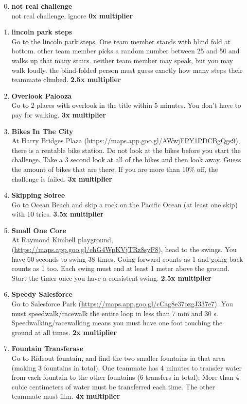 \documentclass{article}
\begin{document}
\begin{enumerate}
    \setcounter{enumi}{-1}
    \item \textbf{not real challenge} \\ not real challenge, ignore \textbf{0x multiplier}
    \item \textbf{lincoln park steps} \\ Go to the lincoln park steps. One team member stands with blind fold at bottom. other team member picks a random number between 25 and 50 and walks up that many stairs. neither team member may speak, but you may walk loudly. the blind-folded person must guess exactly how many steps their teammate climbed. \textbf{2.5x multiplier}
    \item \textbf{Overlook Palooza} \\ Go to 2 places with overlook in the title within 5 minutes. You don't have to pay for walking. \textbf{3x multiplier}
    \item \textbf{Bikes In The City} \\ At Harry Bridges Plaza (\url{https://maps.app.goo.gl/AWwjFPY1PDCBgQgs9}), there is a rentable bike station. Do not look at the bikes before you start the challenge. Take a 3 second look at all of the bikes and then look away. Guess the amount of bikes that are there. If you are more than 10\% off, the challenge is failed. \textbf{3x multiplier} 
    \item \textbf{Skipping Soiree} \\ Go to Ocean Beach and skip a rock on the Pacific Ocean (at least one skip) with 10 tries. \textbf{3.5x multiplier}
    \item \textbf{Small One Core} \\ At Raymond Kimbell playground,  (\url{https://maps.app.goo.gl/ehG4WpKVjTRz8syF8}), head to the swings. You have 60 seconds to swing 38 times. Going forward counts as 1 and going back counts as 1 too. Each swing must end at least 1 meter above the ground. Start the timer once you have a consistent swing. \textbf{2.5x multiplier}
    \item \textbf{Speedy Salesforce} \\ Go to Salesforce Park (\url{https://maps.app.goo.gl/cCag8e37ozgJ337e7}). You must speedwalk/racewalk the entire loop in less than 7 min and 30 s. Speedwalking/racewalking means you must have one foot touching the ground at all times. \textbf{2x multiplier}
    \item \textbf{Fountain Transferase} \\ Go to Rideout fountain, and find the two smaller fountains in that area (making 3 fountains in total). One teammate has 4 minutes to transfer water from each fountain to the other fountains (6 transfers in total). More than 4 cubic centimeters of water must be transferred each time. The other teammate must film. \textbf{4x multiplier}

\end{enumerate}
\end{document}
